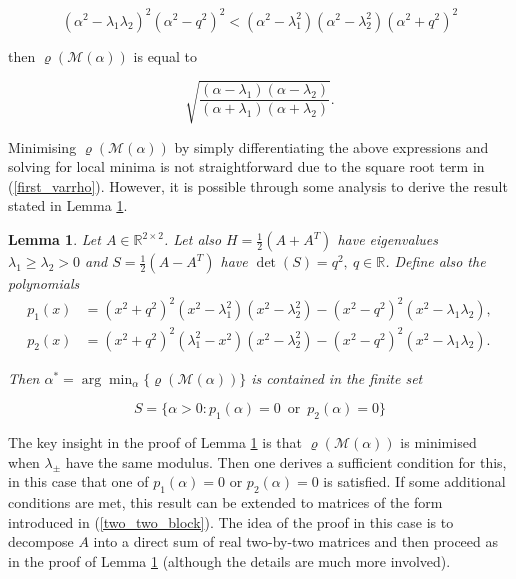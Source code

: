 \documentclass{article}
\newcommand{\bR}{\mathds{R}}
\newtheorem{lemma}[theorem]{Lemma}
\begin{document}
\begin{equation}\label{second_condition}
    (\alpha^2 - \lambda_1\lambda_2)^2(\alpha^2-q^2)^2 < (\alpha^2 - \lambda_1^2)(\alpha^2 - \lambda_2^2)(\alpha^2 + q^2)^2
\end{equation}

then $\varrho(\mathcal{M}(\alpha))$ is equal to

\begin{equation}\label{second_varrho}
    \sqrt{\frac{(\alpha - \lambda_1)(\alpha - \lambda_2)}{(\alpha + \lambda_1)(\alpha + \lambda_2)}}.
\end{equation}

Minimising $\varrho(\mathcal{M}(\alpha))$ by simply differentiating the above expressions and solving for local minima is not straightforward due to the square root term in (\ref{first_varrho}). However, it is possible through some analysis to derive the result stated in Lemma \ref{optimal_two_two_lemma}.

\begin{lemma}\label{optimal_two_two_lemma}
    Let $A \in \bR^{2\times2}$. Let also $H = \frac{1}{2}(A + A^T)$ have eigenvalues $\lambda_1 \geq \lambda_2 > 0$ and $S = \frac{1}{2}(A - A^T)$ have $\det(S) = q^2, \: q\in \bR$. Define also the polynomials
\begin{align*}
p_1(x) &= (x^2 + q^2)^2(x^2 - \lambda_1^2)(x^2-\lambda_2^2) - (x^2-q^2)^2(x^2-\lambda_1\lambda_2), \\
p_2(x)  &= (x^2 + q^2)^2(\lambda_1^2 - x^2)(x^2-\lambda_2^2) - (x^2-q^2)^2(x^2-\lambda_1\lambda_2).
\end{align*}

Then $\alpha^\ast = \arg \min_{\alpha} \{\varrho(\mathcal{M}(\alpha))\} $ is contained in the finite set

\begin{equation}
    S = \{ \alpha > 0: p_1(\alpha) = 0 \; \: \text{or} \; \: p_2(\alpha) = 0 \}
\end{equation}
\end{lemma}

The key insight in the proof of Lemma \ref{optimal_two_two_lemma} is that $\varrho(\mathcal{M}(\alpha))$ is minimised when $\lambda_{\pm}$ have the same modulus. Then one derives a sufficient condition for this, in this case that one of $p_1(\alpha) = 0$ or $p_2(\alpha) = 0$ is satisfied. If some additional conditions are met, this result can be extended to matrices of the form introduced in (\ref{two_two_block}). The idea of the proof in this case is to decompose $A$ into a direct sum of real two-by-two matrices and then proceed as in the proof of Lemma \ref{optimal_two_two_lemma} (although the details are much more involved).
\end{document}
